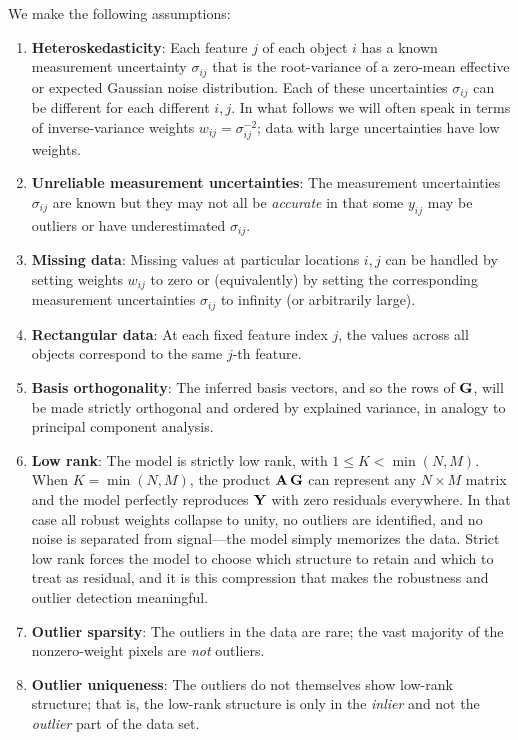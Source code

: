 \documentclass[onecolumn,floatfix,linenumbers,trackchanges]{aastex631}
\begin{document}
We make the following assumptions:
\begin{enumerate}
    \item \textbf{Heteroskedasticity}: Each feature $j$ of each object $i$ has a known measurement uncertainty $\sigma_{ij}$ that is the root-variance of a zero-mean effective or expected Gaussian noise distribution. Each of these uncertainties $\sigma_{ij}$ can be different for each different $i,j$. In what follows we will often speak in terms of inverse-variance weights $w_{ij}=\sigma_{ij}^{-2}$; data with large uncertainties have low weights.
    \item \textbf{Unreliable measurement uncertainties}: The measurement uncertainties $\sigma_{ij}$ are known but they may not all be \emph{accurate} in that some $y_{ij}$ may be outliers or have underestimated $\sigma_{ij}$.
    \item \textbf{Missing data}: Missing values at particular locations $i, j$ can be handled by setting weights $w_{ij}$ to zero or (equivalently) by setting the corresponding measurement uncertainties $\sigma_{ij}$ to infinity (or arbitrarily large).
    \item \textbf{Rectangular data}: At each fixed feature index $j$, the values across all objects correspond to the same $j$-th feature.
    \item \textbf{Basis orthogonality}: The inferred basis vectors, and so the rows of ${\bf G}$, will be made strictly orthogonal and ordered by explained variance, in analogy to principal component analysis.
      \item \textbf{Low rank}: The model is strictly low rank, with $1 \le K < \min(N, M)$. When $K = \min(N, M)$, the product ${\bf A}\,{\bf G}$ can represent any $N \times M$ matrix and the model perfectly reproduces ${\bf Y}$ with zero residuals everywhere. In that case all robust weights collapse to unity, no outliers are identified, and no noise is separated from signal---the model simply memorizes the data. Strict low rank forces the model to choose which structure to retain and which to treat as residual, and it is this compression that makes the robustness and outlier detection meaningful.
    \item \textbf{Outlier sparsity}: The outliers in the data are rare; the vast majority of the nonzero-weight pixels are \emph{not} outliers.
    \item \textbf{Outlier uniqueness}: The outliers do not themselves show low-rank structure; that is, the low-rank structure is only in the \emph{inlier} and not the \emph{outlier} part of the data set.
\end{enumerate}
\end{document}

